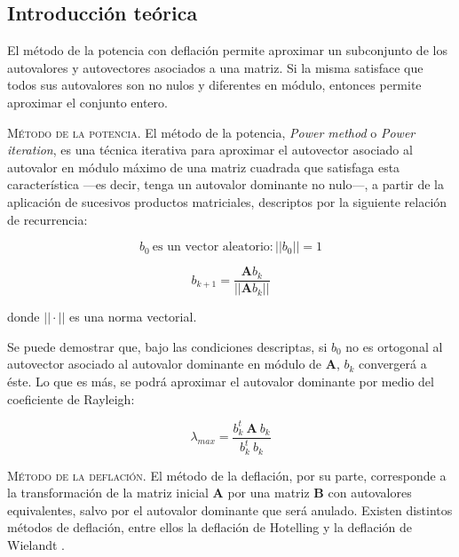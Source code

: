 
\vspace{1em}
\subsection{Introducción teórica} El método de la potencia con deflación permite aproximar un subconjunto de los autovalores y autovectores asociados a una matriz. Si la misma satisface que todos sus autovalores son no nulos y diferentes en módulo, entonces permite aproximar el conjunto entero. 


\vspace{2em}
\noindent \textsc{Método de la potencia}. El método de la potencia, \textit{Power method} o \textit{Power iteration}, es una técnica iterativa para aproximar el autovector asociado al autovalor en módulo máximo de una matriz cuadrada que satisfaga esta característica ---es decir, tenga un autovalor dominante no nulo---, a partir de la aplicación de sucesivos productos matriciales, descriptos por la siguiente relación de recurrencia:

\begin{equation*}
    b_0\ \text{es un vector aleatorio} : ||b_0|| = 1
\end{equation*}

\begin{equation} \label{potencia}
    b_{k+1} = \frac{\mathbf{A}b_k}{||\mathbf{A}b_k||}
\end{equation}

\vspace{1em}
\noindent donde $|| \cdot ||$ es una norma vectorial.

\vspace{1em}
Se puede demostrar \cite{Burden} que, bajo las condiciones descriptas, si $b_0$ no es ortogonal al autovector asociado al autovalor dominante en módulo de \textbf{A}, $b_k$ convergerá a éste. Lo que es más, se podrá aproximar el autovalor dominante por medio del coeficiente de Rayleigh:

\vspace{1em}
\begin{equation} \label{rayleigh}
    \lambda_{max} = \frac{b_k^t\ \mathbf{A}\ b_k}{b_k^t\ b_k}
\end{equation}


\vspace{2em}
\noindent \textsc{Método de la deflación}. El método de la deflación, por su parte, corresponde a la transformación de la matriz inicial \textbf{A} por una matriz \textbf{B} con autovalores equivalentes, salvo por el autovalor dominante que será anulado. Existen distintos métodos de deflación, entre ellos la deflación de Hotelling y la deflación de Wielandt \cite{Burden}.  

